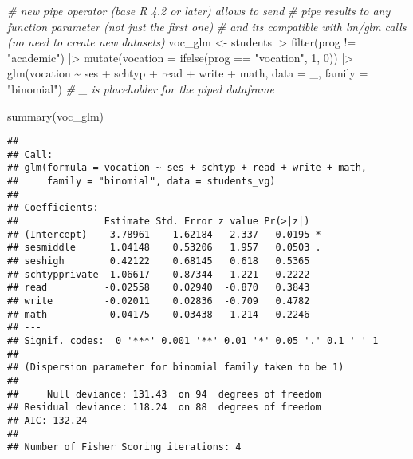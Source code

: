 \documentclass[
  oneside]{book}
\newenvironment{Shaded}{\begin{snugshade}}{\end{snugshade}}
\newcommand{\AttributeTok}[1]{\textcolor[rgb]{0.77,0.63,0.00}{#1}}
\newcommand{\CommentTok}[1]{\textcolor[rgb]{0.56,0.35,0.01}{\textit{#1}}}
\newcommand{\DecValTok}[1]{\textcolor[rgb]{0.00,0.00,0.81}{#1}}
\newcommand{\FunctionTok}[1]{\textcolor[rgb]{0.00,0.00,0.00}{#1}}
\newcommand{\NormalTok}[1]{#1}
\newcommand{\OtherTok}[1]{\textcolor[rgb]{0.56,0.35,0.01}{#1}}
\newcommand{\SpecialCharTok}[1]{\textcolor[rgb]{0.00,0.00,0.00}{#1}}
\newcommand{\StringTok}[1]{\textcolor[rgb]{0.31,0.60,0.02}{#1}}
\begin{document}
\begin{Shaded}
\begin{Highlighting}[]
\CommentTok{\# new pipe operator (base R 4.2 or later) allows to send}
\CommentTok{\# pipe results to any function parameter (not just the first one)}
\CommentTok{\# and it\textquotesingle{}s compatible with lm/glm calls (no need to create new datasets)}
\NormalTok{voc\_glm }\OtherTok{\textless{}{-}}\NormalTok{ students }\SpecialCharTok{|\textgreater{}}
  \FunctionTok{filter}\NormalTok{(prog }\SpecialCharTok{!=} \StringTok{"academic"}\NormalTok{) }\SpecialCharTok{|\textgreater{}}
  \FunctionTok{mutate}\NormalTok{(}\AttributeTok{vocation =} \FunctionTok{ifelse}\NormalTok{(prog }\SpecialCharTok{==} \StringTok{"vocation"}\NormalTok{, }\DecValTok{1}\NormalTok{, }\DecValTok{0}\NormalTok{)) }\SpecialCharTok{|\textgreater{}}
  \FunctionTok{glm}\NormalTok{(vocation }\SpecialCharTok{\textasciitilde{}}\NormalTok{ ses }\SpecialCharTok{+}\NormalTok{ schtyp }\SpecialCharTok{+}\NormalTok{ read }\SpecialCharTok{+}\NormalTok{ write }\SpecialCharTok{+}\NormalTok{ math,}
      \AttributeTok{data =}\NormalTok{ \_, }\AttributeTok{family =} \StringTok{"binomial"}\NormalTok{)}
  \CommentTok{\# \textasciigrave{}\_\textasciigrave{} is placeholder for the piped dataframe}
\end{Highlighting}
\end{Shaded}

\begin{Shaded}
\begin{Highlighting}[]
\FunctionTok{summary}\NormalTok{(voc\_glm)}
\end{Highlighting}
\end{Shaded}

\begin{verbatim}
## 
## Call:
## glm(formula = vocation ~ ses + schtyp + read + write + math, 
##     family = "binomial", data = students_vg)
## 
## Coefficients:
##               Estimate Std. Error z value Pr(>|z|)  
## (Intercept)    3.78961    1.62184   2.337   0.0195 *
## sesmiddle      1.04148    0.53206   1.957   0.0503 .
## seshigh        0.42122    0.68145   0.618   0.5365  
## schtypprivate -1.06617    0.87344  -1.221   0.2222  
## read          -0.02558    0.02940  -0.870   0.3843  
## write         -0.02011    0.02836  -0.709   0.4782  
## math          -0.04175    0.03438  -1.214   0.2246  
## ---
## Signif. codes:  0 '***' 0.001 '**' 0.01 '*' 0.05 '.' 0.1 ' ' 1
## 
## (Dispersion parameter for binomial family taken to be 1)
## 
##     Null deviance: 131.43  on 94  degrees of freedom
## Residual deviance: 118.24  on 88  degrees of freedom
## AIC: 132.24
## 
## Number of Fisher Scoring iterations: 4
\end{verbatim}
\end{document}
